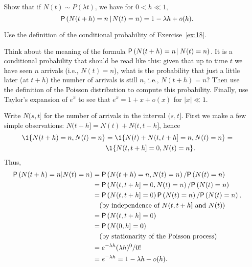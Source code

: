 \begin{exercise}
  Show that if $N(t) \sim P(\lambda t)$, we have for $0<h\ll 1$,
  \begin{equation*}
\P{N(t+h) = n \given N(t) = n} = 1-\lambda h + o(h).
  \end{equation*}
    \begin{hint}
Use  the definition of the conditional probability of Exercise~\ref{ex:18}. 

Think about the meaning of the formula $\P{N(t+h) = n \given N(t) = n}$.
It is a conditional probability that should be read like this: given that up to time $t$ we have seen $n$ arrivals (i.e., $N(t)=n$), what is the probability that just a little later (at $t+h$) the number of arrivals is still $n$, i.e., $N(t+h)=n$?
Then use the definition of the Poisson distribution to compute this probability.
Finally, use Taylor's expansion of $e^{x}$ to see that $e^{x} = 1 +x + o(x)$ for $|x| \ll 1$.
    \end{hint}
\begin{solution}
Write $N(s, t]$ for the number of arrivals in the interval $(s,t]$. First we make a few simple observations: $N(t+h]= N(t) + N(t, t+h]$, hence
\begin{equation*}
  \begin{split}
  \1{N(t+h)=n, N(t)=n}
&=  \1{N(t) + N(t, t+h] = n, N(t)=n} = \\
&\1{N(t, t+h] = 0, N(t)=n}.
  \end{split}
\end{equation*}
Thus, 
    \begin{align*}
  \P{N(t+h) = n | N(t) = n} 
&=  \P{N(t+h) = n, N(t) = n}/\P{N(t)=n} \\
&=  \P{N(t, t+h] = 0,  N(t) = n}/\P{N(t)=n} \\
&=  \P{N(t, t+h] = 0} \P{N(t) = n}/\P{N(t)=n}, \\
& \quad\text{(by independence of } N(t, t+h] \text{ and } N(t))\\
&= \P{N(t, t+h] = 0} \\
&= \P{N(0, h] = 0} \\
&\quad\text{(by stationarity of the Poisson process)}\\
&= e^{-\lambda h} (\lambda h)^0/0! \\
&= e^{-\lambda h} = 1-\lambda h + o(h).
    \end{align*}
\end{solution}
\end{exercise}

